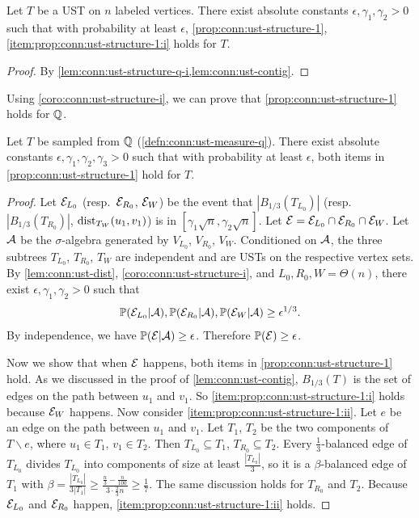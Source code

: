 \begin{corollary} \label{coro:conn:ust-structure-i}
  Let $T$ be a UST on $n$ labeled vertices.
  There exist absolute constants $\epsilon,\gamma_1,\gamma_2>0$ such that with probability at least $\epsilon$, \cref{prop:conn:ust-structure-1}, \cref{item:prop:conn:ust-structure-1:i} holds for $T$.
\end{corollary}
\begin{proof}
  By \cref{lem:conn:ust-structure-q-i,lem:conn:ust-contig}.
\end{proof}
Using \cref{coro:conn:ust-structure-i}, we can prove that \cref{prop:conn:ust-structure-1} holds for $\mathbb{Q}$.
\begin{lemma} \label{lem:conn:ust-structure-q-all}
  Let $T$ be sampled from $\mathbb{Q}$ (\cref{defn:conn:ust-measure-q}).
  There exist absolute constants $\epsilon,\gamma_1,\gamma_2,\gamma_3>0$ such that with probability at least $\epsilon$, both items in \cref{prop:conn:ust-structure-1} hold for $T$.
\end{lemma}
\begin{proof}
  Let $\mathcal{E}_{L_0}$ (resp.~$\mathcal{E}_{R_0}$, $\mathcal{E}_W$) be the event that $\left| B_{1/3}(T_{L_0}) \right|$ (resp.~$\left| B_{1/3}(T_{R_0}) \right|$, $\operatorname{\mathrm{dist}}_{T_W}(u_1,v_1)$) is in $[\gamma_1 \sqrt n, \gamma_2 \sqrt n]$.
  Let $\mathcal{E} = \mathcal{E}_{L_0} \cap \mathcal{E}_{R_0} \cap \mathcal{E}_W$.
  Let $\mathcal{A}$ be the $\sigma$-algebra generated by $V_{L_0}$, $V_{R_0}$, $V_W$.
  Conditioned on $\mathcal{A}$, the three subtrees $T_{L_0}$, $T_{R_0}$, $T_W$ are independent and are USTs on the respective vertex sets.
  By \cref{lem:conn:ust-dist}, \cref{coro:conn:ust-structure-i}, and $L_0,R_0,W=\Theta(n)$, there exist $\epsilon,\gamma_1,\gamma_2>0$ such that
  \begin{align*}
    \mathbb{P}(\mathcal{E}_{L_0} |\mathcal{A}), \mathbb{P}(\mathcal{E}_{R_0} |\mathcal{A}), \mathbb{P}(\mathcal{E}_W |\mathcal{A}) \ge \epsilon^{1/3}.
  \end{align*}
  By independence, we have $\mathbb{P}(\mathcal{E} | \mathcal{A}) \ge \epsilon$.
  Therefore $\mathbb{P}(\mathcal{E}) \ge \epsilon$.

  Now we show that when $\mathcal{E}$ happens, both items in \cref{prop:conn:ust-structure-1} hold.
  As we discussed in the proof of \cref{lem:conn:ust-contig}, $B_{1/3}(T)$ is the set of edges on the path between $u_1$ and $v_1$.
  So \cref{item:prop:conn:ust-structure-1:i} holds because $\mathcal{E}_W$ happens.
  Now consider \cref{item:prop:conn:ust-structure-1:ii}.
  Let $e$ be an edge on the path between $u_1$ and $v_1$.
  Let $T_1$, $T_2$ be the two components of $T\backslash e$, where $u_1\in T_1$, $v_1\in T_2$.
  Then $T_{L_0} \subseteq T_1$, $T_{R_0} \subseteq T_2$.
  Every $\frac 13$-balanced edge of $T_{L_0}$ divides $T_{L_0}$ into components of size at least $\frac{|T_{L_0}|}3$,
  so it is a $\beta$-balanced edge of $T_1$ with $\beta = \frac{|T_{L_0}|}{3 |T_1|} \ge \frac{\frac{n}{3} - \frac{n}{100}}{3 \cdot \frac{2}{3} n} \ge \frac 17$.
  The same discussion holds for $T_{R_0}$ and $T_2$.
  Because $\mathcal{E}_{L_0}$ and $\mathcal{E}_{R_0}$ happen, \cref{item:prop:conn:ust-structure-1:ii} holds.
\end{proof}


